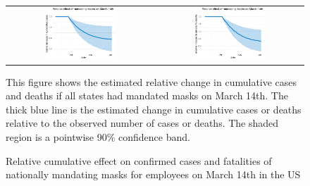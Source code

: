 \documentclass[3p, longtitle]{elsarticle}
\theoremstyle{definition}
\begin{document}
\begin{figure}[ht]
  \caption{Relative cumulative effect  on confirmed cases and fatalities
  of nationally mandating masks for employees on March
    14th in the US \label{fig:US-mask-dgrowth}}
  \begin{minipage}{\linewidth}
    \centering
    \medskip
    \begin{tabular}{cc}
      \includegraphics[width=0.49\textwidth]{tables_and_figures/us-mask-rcumu_idx}
      & \includegraphics[width=0.49\textwidth]{tables_and_figures/us-mask-rcumu_deaths_idx}
    \end{tabular}
    \begin{flushleft}
      \footnotesize This figure shows the estimated relative change in
      cumulative cases and deaths if all states had mandated masks on
      March 14th. The thick blue line is the estimated change in
      cumulative cases or deaths relative to the observed number of
      cases or deaths. The shaded region is a pointwise 90\%
      confidence band.
    \end{flushleft}
  \end{minipage}
\end{figure}
\end{document}
